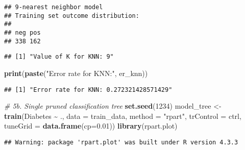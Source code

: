 \documentclass[
]{article}
\newenvironment{Shaded}{\begin{snugshade}}{\end{snugshade}}
\newcommand{\AttributeTok}[1]{\textcolor[rgb]{0.13,0.29,0.53}{#1}}
\newcommand{\CommentTok}[1]{\textcolor[rgb]{0.56,0.35,0.01}{\textit{#1}}}
\newcommand{\DecValTok}[1]{\textcolor[rgb]{0.00,0.00,0.81}{#1}}
\newcommand{\FloatTok}[1]{\textcolor[rgb]{0.00,0.00,0.81}{#1}}
\newcommand{\FunctionTok}[1]{\textcolor[rgb]{0.13,0.29,0.53}{\textbf{#1}}}
\newcommand{\NormalTok}[1]{#1}
\newcommand{\OtherTok}[1]{\textcolor[rgb]{0.56,0.35,0.01}{#1}}
\newcommand{\SpecialCharTok}[1]{\textcolor[rgb]{0.81,0.36,0.00}{\textbf{#1}}}
\newcommand{\StringTok}[1]{\textcolor[rgb]{0.31,0.60,0.02}{#1}}
\begin{document}
\begin{verbatim}
## 9-nearest neighbor model
## Training set outcome distribution:
## 
## neg pos 
## 338 162
\end{verbatim}

\begin{Shaded}
\end{Shaded}

\begin{verbatim}
## [1] "Value of K for KNN: 9"
\end{verbatim}

\begin{Shaded}
\begin{Highlighting}[]
\FunctionTok{print}\NormalTok{(}\FunctionTok{paste}\NormalTok{(}\StringTok{"Error rate for KNN:"}\NormalTok{, er\_knn))}
\end{Highlighting}
\end{Shaded}

\begin{verbatim}
## [1] "Error rate for KNN: 0.272321428571429"
\end{verbatim}

\begin{Shaded}
\begin{Highlighting}[]
\CommentTok{\# 5b. Single pruned classification tree}
\FunctionTok{set.seed}\NormalTok{(}\DecValTok{1234}\NormalTok{)}
\NormalTok{model\_tree }\OtherTok{\textless{}{-}} \FunctionTok{train}\NormalTok{(Diabetes }\SpecialCharTok{\textasciitilde{}}\NormalTok{ ., }
                    \AttributeTok{data =}\NormalTok{ train\_data, }
                    \AttributeTok{method =} \StringTok{"rpart"}\NormalTok{, }
                    \AttributeTok{trControl =}\NormalTok{ ctrl,}
                    \AttributeTok{tuneGrid =} \FunctionTok{data.frame}\NormalTok{(}\AttributeTok{cp=}\FloatTok{0.01}\NormalTok{))}
\FunctionTok{library}\NormalTok{(rpart.plot)}
\end{Highlighting}
\end{Shaded}

\begin{verbatim}
## Warning: package 'rpart.plot' was built under R version 4.3.3
\end{verbatim}
\end{document}
